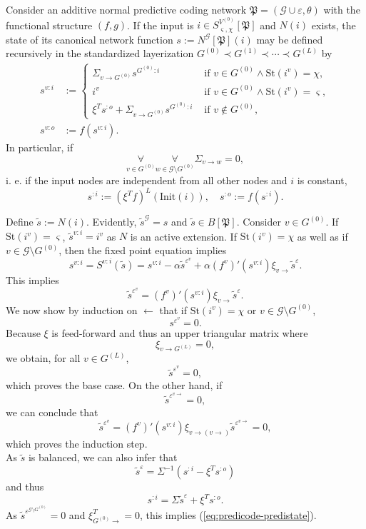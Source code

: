 \documentclass[a4paper,11pt]{report}
\newcommand{\const}{\varsigma} %
\newcommand{\var}{\chi} %
\newcommand{\In}{\text{Init}}
\newcommand{\St}{\text{St}}
\begin{document}
\begin{Lem}\label{lem:predicode-predistate}
Consider an additive normal predictive coding network $\mathfrak{P}=(\mathcal{G}\cup\varepsilon,\theta)$ with the functional structure $(f,g)$. If the input is $i\in S^{V^{(0)}}_{\const,\var}[\mathfrak{P}]$ and $N(i)$ exists, the state of its canonical network function $s:=N^{\mathcal{G}}[\mathfrak{P}](i)$ may be defined recursively in the standardized layerization $G^{(0)}\prec G^{(1)}\prec\dotsb\prec G^{(L)}$ by
\begin{equation}\label{eq:predicode-predistate}
\begin{aligned}
s^{v:i}&:=
\begin{cases}
\Sigma_{v\to G^{(0)}}s^{G^{(0)}:i}&\text{ if }v\in G^{(0)}\wedge\St(i^v)=\var,\\
i^v&\text{ if }v\in G^{(0)}\wedge\St(i^v)=\const,\\
\xi^Ts^{:o}+\Sigma_{v\to G^{(0)}}s^{G^{(0)}:i}&\text{ if }v\notin G^{(0)},
\end{cases}
\\
s^{v:o}&:=f(s^{v:i}).
\end{aligned}
\end{equation}
In particular, if
\[
\underset{v\in G^{(0)}}{\forall}\underset{w\in \mathcal{G}\setminus G^{(0)}}{\forall}\Sigma_{v\to w}=0,
\]
i. e. if the input nodes are independent from all other nodes and $i$ is constant, 
\begin{equation}
s^{:i}:=\left(\xi^Tf\right)^{L}\left(\In(i)\right),
\quad
s^{:o}:=f(s^{:i}).
\end{equation}
\end{Lem}

\begin{Bew}
Define $\tilde{s}:=N(i)$. Evidently, $\tilde{s}^{\mathcal{G}}=s$ and $\tilde{s}\in B[\mathfrak{P}]$. Consider $v\in G^{(0)}$. If $\St(i^v)=\const$, $\tilde{s}^{v:i}=i^v$ as $N$ is an active extension. If $\St(i^v)=\var$ as well as if $v\in\mathcal{G}\setminus G^{(0)}$, then the fixed point equation implies
\[
s^{v:i}=S^{v:i}(\tilde{s})=s^{v:i}-\alpha \tilde{s}^{\varepsilon^v}+\alpha\left(f^v\right)'(s^{v:i})\xi_{v\to} \tilde{s}^{\varepsilon}.
\]
This implies
\[
\tilde{s}^{\varepsilon^v}=\left(f^v\right)'(s^{v:i})\xi_{v\to}\tilde{s}^{\varepsilon}.
\]
We now show by induction on $\leftarrow$ that if $\St(i^v)=\var$ or $v\in\mathcal{G}\setminus G^{(0)}$,
\[
s^{\varepsilon^v}=0.
\]
Because $\xi$ is feed-forward and thus an upper triangular matrix where
\[
\xi_{v\to G^{(L)}}=0,
\]
we obtain, for all $v\in G^{(L)}$,
\[
\tilde{s}^{\varepsilon^v}=0,
\]
which proves the base case.
On the other hand, if
\[
\tilde{s}^{\varepsilon^{v\to}}=0,
\]
we can conclude that
\[
\tilde{s}^{\varepsilon^{v}}=\left(f^v\right)'(s^{v:i})\xi_{v\to(v\to)}\tilde{s}^{\varepsilon^{v\to}}=0,
\]
which proves the induction step.\\
As $\tilde{s}$ is balanced, we can also infer that
\[
\tilde{s}^{\varepsilon}=\Sigma^{-1}(s^{:i}-\xi^Ts^{:o})
\]
and thus
\[
s^{:i}=\Sigma\tilde{s}^{\varepsilon}+\xi^Ts^{:o}.
\]
As $\tilde{s}^{\varepsilon^{\mathcal{G}\setminus G^{(0)}}}=0$ and $\xi^{T}_{G^{(0)}\to}=0$, this implies (\ref{eq:predicode-predistate}).
\end{Bew}
\end{document}

